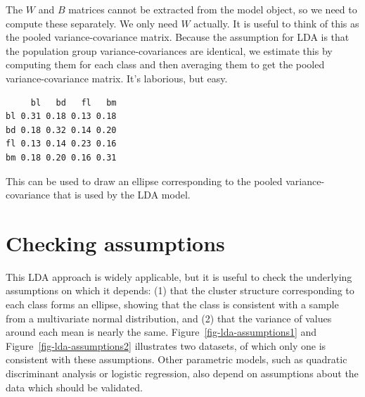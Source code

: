 \documentclass[
  letterpaper,
]{book}
\newenvironment{Shaded}{\begin{snugshade}}{\end{snugshade}}
\newcommand{\DecValTok}[1]{\textcolor[rgb]{0.68,0.00,0.00}{#1}}
\newcommand{\FunctionTok}[1]{\textcolor[rgb]{0.28,0.35,0.67}{#1}}
\newcommand{\NormalTok}[1]{\textcolor[rgb]{0.00,0.23,0.31}{#1}}
\newcommand{\OtherTok}[1]{\textcolor[rgb]{0.00,0.23,0.31}{#1}}
\newcommand{\SpecialCharTok}[1]{\textcolor[rgb]{0.37,0.37,0.37}{#1}}
\begin{document}
The \(W\) and \(B\) matrices cannot be extracted from the model object,
so we need to compute these separately. We only need \(W\) actually. It
is useful to think of this as the pooled variance-covariance matrix.
Because the assumption for LDA is that the population group
variance-covariances are identical, we estimate this by computing them
for each class and then averaging them to get the pooled
variance-covariance matrix. It's laborious, but easy.

\begin{Shaded}
\end{Shaded}

\begin{verbatim}
     bl   bd   fl   bm
bl 0.31 0.18 0.13 0.18
bd 0.18 0.32 0.14 0.20
fl 0.13 0.14 0.23 0.16
bm 0.18 0.20 0.16 0.31
\end{verbatim}

This can be used to draw an ellipse corresponding to the pooled
variance-covariance that is used by the LDA model.

\hypertarget{checking-assumptions}{%
\section{Checking assumptions}\label{checking-assumptions}}

This LDA approach is widely applicable, but it is useful to check the
underlying assumptions on which it depends: (1) that the cluster
structure corresponding to each class forms an ellipse, showing that the
class is consistent with a sample from a multivariate normal
distribution, and (2) that the variance of values around each mean is
nearly the same. Figure~\ref{fig-lda-assumptions1} and
Figure~\ref{fig-lda-assumptions2} illustrates two datasets, of which
only one is consistent with these assumptions. Other parametric models,
such as quadratic discriminant analysis or logistic regression, also
depend on assumptions about the data which should be validated.
\end{document}
